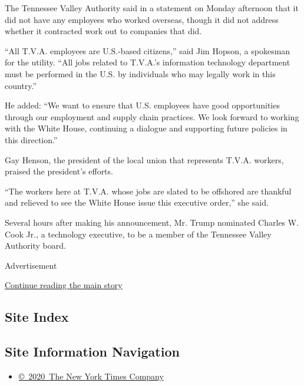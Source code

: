 The Tennessee Valley Authority said in a statement on Monday afternoon
that it did not have any employees who worked overseas, though it did
not address whether it contracted work out to companies that did.

``All T.V.A. employees are U.S.-based citizens,'' said Jim Hopson, a
spokesman for the utility. ``All jobs related to T.V.A.'s information
technology department must be performed in the U.S. by individuals who
may legally work in this country.''

He added: ``We want to ensure that U.S. employees have good
opportunities through our employment and supply chain practices. We look
forward to working with the White House, continuing a dialogue and
supporting future policies in this direction.''

Gay Henson, the president of the local union that represents T.V.A.
workers, praised the president's efforts.

``The workers here at T.V.A. whose jobs are slated to be offshored are
thankful and relieved to see the White House issue this executive
order,'' she said.

Several hours after making his announcement, Mr. Trump nominated Charles
W. Cook Jr., a technology executive, to be a member of the Tennessee
Valley Authority board.

Advertisement

\protect\hyperlink{after-bottom}{Continue reading the main story}

\hypertarget{site-index}{%
\subsection{Site Index}\label{site-index}}

\hypertarget{site-information-navigation}{%
\subsection{Site Information
Navigation}\label{site-information-navigation}}

\begin{itemize}
\tightlist
\item
  \href{https://help.nytimes.com/hc/en-us/articles/115014792127-Copyright-notice}{©~2020~The
  New York Times Company}
\end{itemize}

